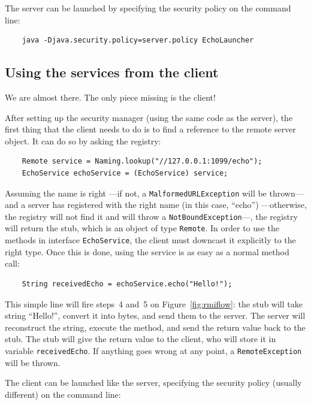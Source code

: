 The server can be launched by specifying the security policy on the
command line: 

\begin{verbatim}
    java -Djava.security.policy=server.policy EchoLauncher
\end{verbatim}

\subsection{Using the services from the client}
\label{sec:using-services-from}

We are almost there. The only piece missing is the client! 

After setting up the security manager (using the same code as the
server), the first thing that the client needs to do is to find a
reference to the remote server object. It can do so by asking the
registry:

\begin{verbatim}
    Remote service = Naming.lookup("//127.0.0.1:1099/echo"); 
    EchoService echoService = (EchoService) service;
\end{verbatim}

Assuming the name is right ---if not, a \verb+MalformedURLException+
will be thrown--- and a server has registered with the right name (in
this case, ``echo'') ---otherwise, the registry will not find it and
will throw a \verb+NotBoundException+---, the registry will return the
stub, which is an object of type \verb+Remote+. In order to use the
methods in interface \verb+EchoService+, the client must downcast it
explicitly to the right type. Once this is done, using the service is
as easy as a normal method call:

\begin{verbatim}
    String receivedEcho = echoService.echo("Hello!");
\end{verbatim}

This simple line will fire steps~4 and~5 
on Figure~\ref{fig:rmiflow}: the stub
will take string ``Hello!'', convert it into bytes, and send them to
the server. The server will reconstruct the string, execute the
method, and send the return value back to the stub. The stub will give
the return value to the client, who will store it in variable
\verb+receivedEcho+. If anything goes wrong at any point, a
\verb+RemoteException+ will be thrown. 

The client can be launched like the server, specifying the security
policy (usually different) on the command line: 

